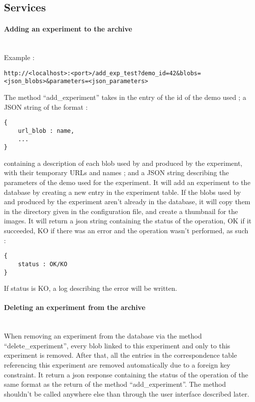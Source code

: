 \subsection{Services}

\paragraph{Adding an experiment to the archive} \hspace{0pt} \\
Example :
\begin{verbatim}
http://<localhost>:<port>/add_exp_test?demo_id=42&blobs=
<json_blobs>&parameters=<json_parameters>
\end{verbatim}
The method ``add\_experiment'' takes in the entry of the id of the demo used ; a JSON string of the format : 

\begin{verbatim}
{
    url_blob : name,
    ...
}
\end{verbatim}

containing a description of each blob used by and produced by the experiment, with their temporary URLs and names ; and a JSON string describing the parameters of the demo used for the experiment. It will add an experiment to the database by creating a new entry in the experiment table. If the blobs used by and produced by the experiment aren't already in the database, it will copy them in the directory given in the configuration file, and create a thumbnail for the images. It will return a json string containing the status of the operation, OK if it succeeded, KO if there was an error and the operation wasn't performed, as such :

\begin{verbatim}
{
    status : OK/KO
}
\end{verbatim}

If status is KO, a log describing the error will be written.

\paragraph{Deleting an experiment from the archive} \hspace{0pt} \\
When removing an experiment from the database via the method ``delete\_experiment'', every blob linked to this experiment and only to this experiment is removed. After that, all the entries in the correspondence table referencing this experiment are removed automatically due to a foreign key constraint. It return a json response containing the status of the operation of the same format as the return of the method ``add\_experiment''. The method shouldn't be called anywhere else than through the user interface described later.

